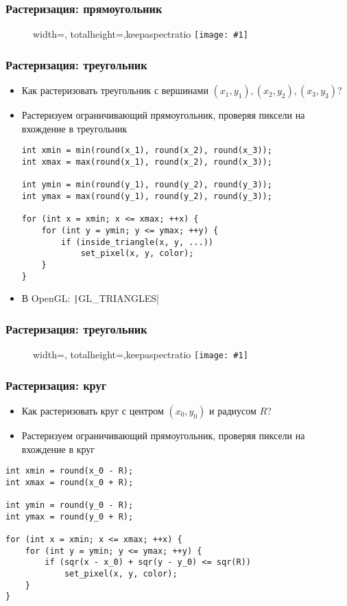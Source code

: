 \documentclass[10pt]{beamer}
\newcommand{\slideimage}[1]{
  \begin{figure}
    \begin{adjustbox}{width=\textwidth, totalheight=\textheight-2\baselineskip-2\baselineskip,keepaspectratio}
      \texttt{[image: \#1]}
    \end{adjustbox}
  \end{figure}
}
\begin{document}
\begin{frame}
\frametitle{Растеризация: прямоугольник}
\slideimage{raster-rect.png}
\end{frame}

\begin{frame}[fragile]
\frametitle{Растеризация: треугольник}
\begin{itemize}
\item Как растеризовать треугольник с вершинами \begin{math}(x_1, y_1), (x_2, y_2), (x_3, y_3)\end{math}?
\pause
\item Растеризуем ограничивающий прямоугольник, проверяя пиксели на вхождение в треугольник
\pause
{}
\begin{verbatim}
int xmin = min(round(x_1), round(x_2), round(x_3));
int xmax = max(round(x_1), round(x_2), round(x_3));

int ymin = min(round(y_1), round(y_2), round(y_3));
int ymax = max(round(y_1), round(y_2), round(y_3));

for (int x = xmin; x <= xmax; ++x) {
    for (int y = ymin; y <= ymax; ++y) {
        if (inside_triangle(x, y, ...))
            set_pixel(x, y, color);
    }
}
\end{verbatim}
\pause
{}
\item В OpenGL: \texttt|GL_TRIANGLES|
\end{itemize}
\end{frame}

\begin{frame}
\frametitle{Растеризация: треугольник}
\slideimage{raster-triangle.png}
\end{frame}

\begin{frame}[fragile]
\frametitle{Растеризация: круг}
\begin{itemize}
\item Как растеризовать круг с центром \begin{math}(x_0, y_0)\end{math} и радиусом \begin{math}R\end{math}?
\pause
\item Растеризуем ограничивающий прямоугольник, проверяя пиксели на вхождение в круг
\end{itemize}
\pause
{}
\begin{verbatim}
int xmin = round(x_0 - R);
int xmax = round(x_0 + R);

int ymin = round(y_0 - R);
int ymax = round(y_0 + R);

for (int x = xmin; x <= xmax; ++x) {
    for (int y = ymin; y <= ymax; ++y) {
        if (sqr(x - x_0) + sqr(y - y_0) <= sqr(R))
            set_pixel(x, y, color);
    }
}
\end{verbatim}
\end{frame}
\end{document}
